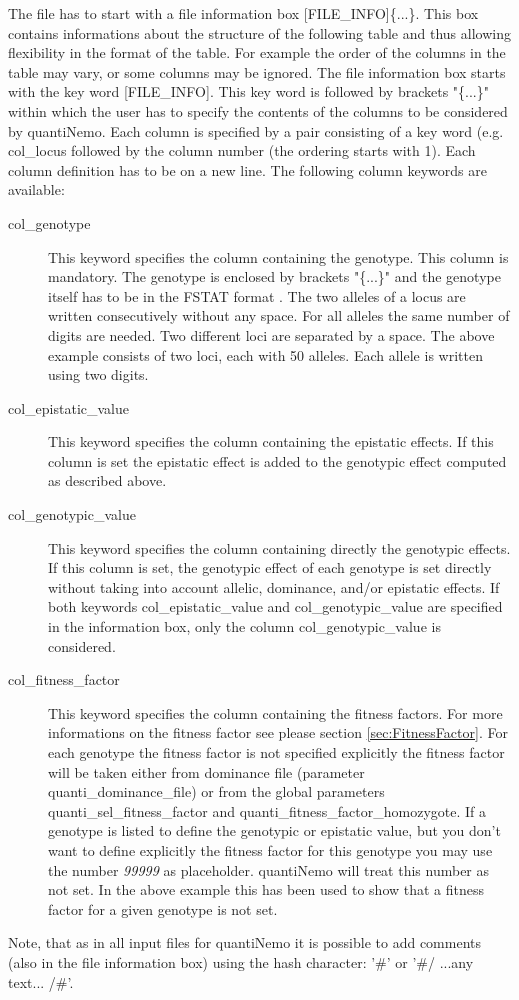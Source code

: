 \documentclass[letterpaper,12pt,oneside]{book}
\begin{document}
\begin{description}
The file has to start with a file information box \textsf{[FILE\_INFO]}\{...\}. 
This box contains informations about the structure of the following table and thus allowing flexibility in the format of the table. For example the order of the columns in the table may vary, or some columns may be ignored. The file information box starts with the key word \textsf{[FILE\_INFO]}. This key word is followed by brackets "\{...\}" within which the user has to specify the contents of the columns to be considered by quantiNemo. Each column is specified by a pair consisting of a key word (e.g. \textsf{col\_locus} followed by the column number (the ordering starts with 1). Each column definition has to be on a new line. The following column keywords are available:
\begin{description}
\item [col\_genotype] This keyword specifies the column containing the genotype. This column is mandatory. The genotype is enclosed by brackets "\{...\}" and the genotype itself has to be in the FSTAT format \citep{Goudet_1995}. The two alleles of a locus are written consecutively without any space. For all alleles the same number of digits are needed. Two different loci are separated by a space. The above example consists of two loci, each with 50 alleles. Each allele is written using two digits. 
\item [col\_epistatic\_value] This keyword specifies the column containing the epistatic effects. If this column is set the epistatic effect is added to the genotypic effect computed as described above.
\item [col\_genotypic\_value] This keyword specifies the column containing directly the genotypic effects. If this column is set, the genotypic effect of each genotype is set directly without taking into account allelic, dominance, and/or epistatic effects. If both keywords \textsf{col\_epistatic\_value} and \textsf{col\_genotypic\_value} are specified in the information box, only the column \textsf{col\_genotypic\_value} is considered. 
\item [col\_fitness\_factor] This keyword specifies the column containing the fitness factors. For more informations on the fitness factor see please section \ref{sec:FitnessFactor}. For each genotype the fitness factor is not specified explicitly the fitness factor will be taken either from dominance file (parameter \textsf{quanti\_dominance\_file}) or from the global parameters \textsf{quanti\_sel\_fitness\_factor} and \textsf{quanti\_fitness\_factor\_homozygote}. If a genotype is listed to define the genotypic or epistatic value, but you don't want to define explicitly the fitness factor for this genotype you may use the number \textit{99999} as placeholder. quantiNemo will treat this number as not set. In the above example this has been used to show that a fitness factor for a given genotype is not set.
\end{description} 
Note, that as in all input files for quantiNemo it is possible to add comments (also in the file information box) using the hash character: '\#' or '\#/ ...any text... /\#'.


\end{description}
\end{document}
